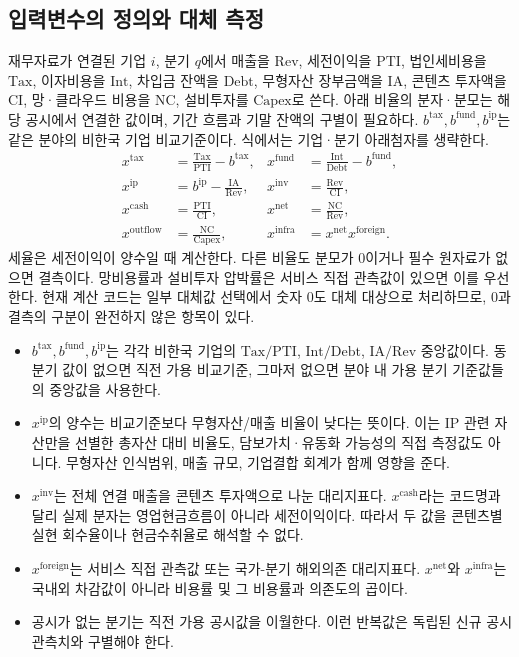 \documentclass[11pt,a4paper]{report}
\begin{document}
\subsection{입력변수의 정의와 대체 측정}
재무자료가 연결된 기업 \(i\), 분기 \(q\)에서 매출을 \(\mathrm{Rev}\), 세전이익을 \(\mathrm{PTI}\), 법인세비용을 \(\mathrm{Tax}\), 이자비용을 \(\mathrm{Int}\), 차입금 잔액을 \(\mathrm{Debt}\), 무형자산 장부금액을 \(\mathrm{IA}\), 콘텐츠 투자액을 \(\mathrm{CI}\), 망·클라우드 비용을 \(\mathrm{NC}\), 설비투자를 \(\mathrm{Capex}\)로 쓴다. 아래 비율의 분자·분모는 해당 공시에서 연결한 값이며, 기간 흐름과 기말 잔액의 구별이 필요하다. \(b^{\mathrm{tax}},b^{\mathrm{fund}},b^{\mathrm{ip}}\)는 같은 분야의 비한국 기업 비교기준이다. 식에서는 기업·분기 아래첨자를 생략한다.
\[
\begin{aligned}
x^{\mathrm{tax}}&=\frac{\mathrm{Tax}}{\mathrm{PTI}}-b^{\mathrm{tax}},
&
x^{\mathrm{fund}}&=\frac{\mathrm{Int}}{\mathrm{Debt}}-b^{\mathrm{fund}},\\
x^{\mathrm{ip}}&=b^{\mathrm{ip}}-\frac{\mathrm{IA}}{\mathrm{Rev}},
&
x^{\mathrm{inv}}&=\frac{\mathrm{Rev}}{\mathrm{CI}},\\
x^{\mathrm{cash}}&=\frac{\mathrm{PTI}}{\mathrm{CI}},
&
x^{\mathrm{net}}&=\frac{\mathrm{NC}}{\mathrm{Rev}},\\
x^{\mathrm{outflow}}&=\frac{\mathrm{NC}}{\mathrm{Capex}},
&
x^{\mathrm{infra}}&=x^{\mathrm{net}}x^{\mathrm{foreign}} .
\end{aligned}
\]
세율은 세전이익이 양수일 때 계산한다. 다른 비율도 분모가 0이거나 필수 원자료가 없으면 결측이다. 망비용률과 설비투자 압박률은 서비스 직접 관측값이 있으면 이를 우선한다. 현재 계산 코드는 일부 대체값 선택에서 숫자 0도 대체 대상으로 처리하므로, 0과 결측의 구분이 완전하지 않은 항목이 있다.

\begin{itemize}[leftmargin=1.8em,itemsep=0.35em]
  \item \(b^{\mathrm{tax}},b^{\mathrm{fund}},b^{\mathrm{ip}}\)는 각각 비한국 기업의 \(\mathrm{Tax}/\mathrm{PTI}\), \(\mathrm{Int}/\mathrm{Debt}\), \(\mathrm{IA}/\mathrm{Rev}\) 중앙값이다. 동분기 값이 없으면 직전 가용 비교기준, 그마저 없으면 분야 내 가용 분기 기준값들의 중앙값을 사용한다.
  \item \(x^{\mathrm{ip}}\)의 양수는 비교기준보다 무형자산/매출 비율이 낮다는 뜻이다. 이는 IP 관련 자산만을 선별한 총자산 대비 비율도, 담보가치·유동화 가능성의 직접 측정값도 아니다. 무형자산 인식범위, 매출 규모, 기업결합 회계가 함께 영향을 준다.
  \item \(x^{\mathrm{inv}}\)는 전체 연결 매출을 콘텐츠 투자액으로 나눈 대리지표다. \(x^{\mathrm{cash}}\)라는 코드명과 달리 실제 분자는 영업현금흐름이 아니라 세전이익이다. 따라서 두 값을 콘텐츠별 실현 회수율이나 현금수취율로 해석할 수 없다.
  \item \(x^{\mathrm{foreign}}\)는 서비스 직접 관측값 또는 국가-분기 해외의존 대리지표다. \(x^{\mathrm{net}}\)와 \(x^{\mathrm{infra}}\)는 국내외 차감값이 아니라 비용률 및 그 비용률과 의존도의 곱이다.
  \item 공시가 없는 분기는 직전 가용 공시값을 이월한다. 이런 반복값은 독립된 신규 공시 관측치와 구별해야 한다.
\end{itemize}
\end{document}
